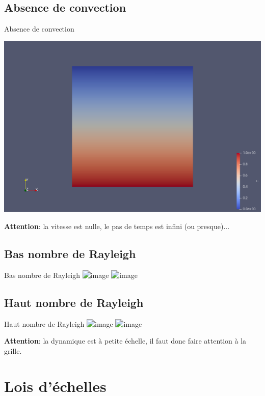 \documentclass[9pt]{beamer}
\begin{document}
\subsection{Absence de convection}
\begin{frame}{Absence de convection}

\includegraphics[width=\textwidth]{fig/screen_Ra1e2.png}

    \textbf{Attention}: la vitesse est nulle, le pas de temps est infini (ou presque)...
\end{frame}

\subsection{Bas nombre de Rayleigh}
\begin{frame}{Bas nombre de Rayleigh}
    \includegraphics<1>[width=\textwidth]{fig/screen_Ra1e4.png}
    \includegraphics<2>[width=\textwidth]{fig/screen_Ra1e4_edges.png}
\end{frame}

\subsection{Haut nombre de Rayleigh}
\begin{frame}{Haut nombre de Rayleigh}
    \includegraphics<1>[width=\textwidth]{fig/screen_Ra3e6.png}
    \includegraphics<2>[width=\textwidth]{fig/screen_Ra3e6_edges.png}
   
    \textbf{Attention}: la dynamique est à petite échelle, il faut donc faire attention à la grille.
\end{frame}

\section{Lois d'échelles}
\end{document}
